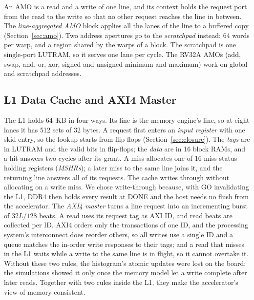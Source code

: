 \documentclass[journal]{IEEEtran}
\begin{document}
An AMO is a read and a write of one line, and its context holds the request port
from the read to the write so that no other request reaches the line in between.
The \emph{line-aggregated AMO} block applies all the lanes of the line to a
buffered copy (Section~\ref{sec:amo}). Two address apertures go to the
\emph{scratchpad} instead: 64 words per warp, and a region shared by the warps of
a block. The scratchpad is one single-port LUTRAM, so it serves one lane per
cycle. The RV32A AMOs (add, swap, and, or, xor, signed and unsigned minimum and
maximum) work on global and scratchpad addresses.

\subsection{L1 Data Cache and AXI4 Master}\label{sec:l1}
The L1 holds 64~KB in four ways. Its line is the memory engine's line, so at
eight lanes it has 512 sets of 32 bytes. A request first enters an \emph{input
register} with one skid entry, so the lookup starts from flip-flops
(Section~\ref{sec:closure}). The \emph{tags} are in LUTRAM and the valid bits in
flip-flops; the \emph{data} are in 16 block RAMs, and a hit answers two cycles
after its grant. A miss allocates one of 16 miss-status holding registers
(\emph{MSHRs}); a later miss to the same line joins it, and the returning line
answers all of its requests. The cache writes through without allocating on a
write miss. We chose write-through because, with GO invalidating the L1, DDR4
then holds every result at DONE and the host needs no flush from the accelerator.
The \emph{AXI4 master} turns a line request into an incrementing burst of
$32L/128$ beats. A read uses its request tag as AXI ID, and read beats are
collected per ID. AXI4 orders only the transactions of one ID, and the processing
system's interconnect does reorder others, so all writes use a single ID and a
queue matches the in-order write responses to their tags; and a read that misses
in the L1 waits while a write to the same line is in flight, so it cannot overtake
it. Without these two rules, the histogram's atomic updates were lost on the
board; the simulations showed it only once the memory model let a write complete
after later reads. Together with two rules inside the L1, they make the accelerator's
view of memory consistent.
\end{document}
